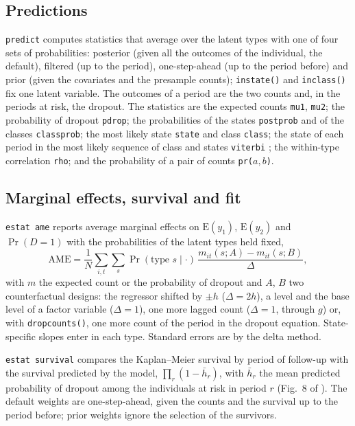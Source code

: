 \documentclass[11pt,a4paper]{article}
\newcommand{\cmd}[1]{\texttt{#1}}
\newcommand{\E}{\mathrm E}
\begin{document}
\subsection{Predictions}

\cmd{predict} computes statistics that average over the latent types with one of four sets of
probabilities: posterior (given all the outcomes of the individual, the default), filtered (up to the
period), one-step-ahead (up to the period before) and prior (given the covariates and the presample
counts); \cmd{instate()} and \cmd{inclass()} fix one latent variable. The outcomes of a period are the two
counts and, in the periods at risk, the dropout. The statistics are the expected counts \cmd{mu1},
\cmd{mu2}; the probability of dropout \cmd{pdrop}; the probabilities of the states \cmd{postprob} and of
the classes \cmd{classprob}; the most likely state \cmd{state} and class \cmd{class}; the state of each
period in the most likely sequence of class and states \cmd{viterbi} \citep{viterbi1967}; the
within-type correlation \cmd{rho}; and the probability of a pair of counts \cmd{pr(}$a,b$\cmd{)}.

\subsection{Marginal effects, survival and fit}

\cmd{estat ame} reports average marginal effects on $\E(y_1)$, $\E(y_2)$ and $\Pr(D=1)$ with the
probabilities of the latent types held fixed,
\[
\mathrm{AME}=\frac1N\sum_{i,t}\sum_{s}\Pr(\text{type } s\mid\cdot)\,
\frac{m_{it}(s;A)-m_{it}(s;B)}{\Delta},
\]
with $m$ the expected count or the probability of dropout and $A$, $B$ two counterfactual designs: the
regressor shifted by $\pm h$ ($\Delta=2h$), a level and the base level of a factor variable
($\Delta=1$), one more lagged count ($\Delta=1$, through $g$) or, with \cmd{dropcounts()}, one more
count of the period in the dropout equation. State-specific slopes enter in each type. Standard errors
are by the delta method.

\cmd{estat survival} compares the Kaplan--Meier survival by period of follow-up with the survival
predicted by the model, $\prod_r(1-\bar h_r)$, with $\bar h_r$ the mean predicted probability of dropout
among the individuals at risk in period $r$ (Fig.~8 of \citealp{carrieri2026}). The default weights are
one-step-ahead, given the counts and the survival up to the period before; prior weights ignore the
selection of the survivors.
\end{document}
